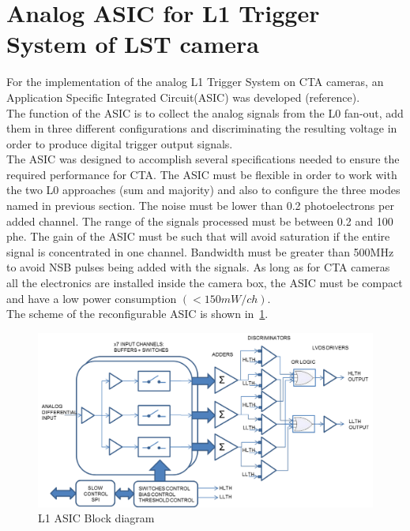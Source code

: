 \documentclass[a4paper,10pt]{book}
\begin{document}
\section{Analog ASIC for L1 Trigger System of LST camera}

For the implementation of the analog L1 Trigger System on CTA cameras, an Application Specific Integrated Circuit(ASIC) was developed (reference).\\

The function of the ASIC is to collect the analog signals from the L0 fan-out, add them in three different configurations and discriminating
the resulting voltage in order to produce digital trigger output signals.\\

The ASIC was designed to accomplish several specifications needed to ensure the required performance for CTA. The ASIC must be flexible in order
to work with the two L0 approaches (sum and majority) and also to configure the three modes named in previous section. The noise must be lower than 
0.2 photoelectrons per added channel. The range of the signals processed must be between 0.2 and 100 phe. The gain of the ASIC must be
such that will avoid saturation if the entire signal is concentrated in one channel. Bandwidth must be greater than 500MHz to avoid NSB
pulses being added with the signals. As long as for CTA cameras all the electronics are installed inside the camera box, the ASIC must be compact
and have a low power consumption $(< 150 mW/ch)$.\\

The scheme of the reconfigurable ASIC is shown in~\ref{fig:figure1}.\\

\begin{figure}
\begin{center}
 \includegraphics[bb=0 0 1296 675,scale=0.25]{./L1blockdiagram.png}
  \caption{L1 ASIC Block diagram}
    \label{fig:figure1}
\end{center}
\end{figure}
\end{document}
